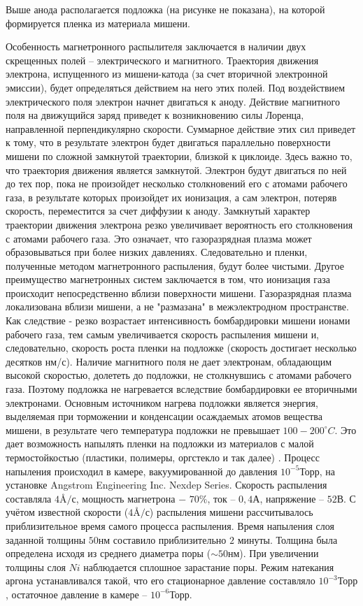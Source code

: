 Выше анода располагается подложка (на рисунке не показана), на которой формируется пленка из материала мишени.

Особенность магнетронного распылителя заключается в наличии двух скрещенных полей – электрического и магнитного.
Траектория движения электрона, испущенного из мишени-катода (за счет вторичной электронной эмиссии), будет определяться действием на него этих полей. Под воздействием электрического поля электрон начнет двигаться к аноду. Действие магнитного поля на движущийся заряд приведет к возникновению силы Лоренца, направленной перпендикулярно скорости. Суммарное действие этих сил приведет к тому, что в результате электрон будет двигаться параллельно поверхности мишени по сложной замкнутой траектории, близкой к циклоиде.
Здесь важно то, что траектория движения является замкнутой. Электрон будут двигаться по ней до тех пор, пока не произойдет несколько столкновений его с атомами рабочего газа, в результате которых произойдет их ионизация, а сам электрон, потеряв скорость, переместится за счет диффузии к аноду. Замкнутый характер траектории движения электрона резко увеличивает вероятность его столкновения с атомами рабочего газа. Это означает, что газоразрядная плазма может образовываться при более низких давлениях. Следовательно и пленки, полученные методом магнетронного распыления, будут более чистыми. Другое преимущество магнетронных систем заключается в том, что ионизация газа происходит непосредственно вблизи поверхности мишени. Газоразрядная плазма локализована вблизи мишени, а не "размазана" в межэлектродном пространстве. Как следствие - резко возрастает интенсивность бомбардировки мишени ионами рабочего газа, тем самым увеличивается скорость распыления мишени и, следовательно, скорость роста пленки на подложке (скорость достигает несколько десятков нм/с). Наличие магнитного поля не дает электронам, обладающим высокой скоростью, долететь до подложки, не столкнувшись с атомами рабочего газа. Поэтому подложка не нагревается вследствие бомбардировки ее вторичными электронами. Основным источником нагрева подложки является энергия, выделяемая при торможении и конденсации осаждаемых атомов вещества мишени, в результате чего температура подложки не превышает $100 - 200^\circ C$. Это дает возможность напылять пленки на подложки из материалов с малой термостойкостью (пластики, полимеры, оргстекло и так далее) \cite{vacuumnoe}. 
Процесс напыления происходил в камере, вакуумированной до давления $10^{−5}\text{Торр}$, на установке Angstrom Engineering Inc. Nexdep Series. Скорость распыления составляла $4\text{Å}/\text{с}$, мощность магнетрона − $70\%$, ток – $0,4\text{А}$, напряжение – $52\text{В}$. С учётом известной скорости ($4 \text{Å}/\text{с}$) распыления мишени рассчитывалось приблизительное время самого процесса распыления. Время напыления слоя заданной толщины $50\text{нм}$ составило приблизительно $2$ минуты. Толщина была определена исходя из среднего диаметра поры ($\sim50\text{нм}$). При увеличении толщины слоя $Ni$ наблюдается сплошное зарастание поры. Режим натекания аргона устанавливался такой, что его стационарное давление составляло $10^{-3}\text{Торр}$, остаточное давление в камере – $10^{-6}\text{Торр}$.

